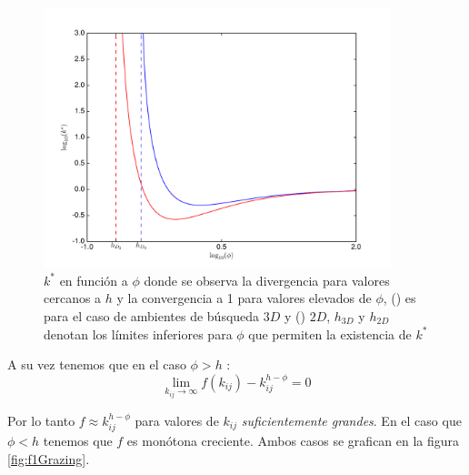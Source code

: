 \begin{figure}
\begin{center}
 \includegraphics[width=0.9\textwidth]{./Plots/kmaxGrazing.pdf}
 \caption[$k^*, Grazing$]{$k^*$ en funci\'on a $\phi$ donde se observa la divergencia para valores cercanos a $h$ y la convergencia a 1 para valores elevados de $\phi$, ({\hwplotB}) es para el caso de ambientes de b\'usqueda $3D$ y ({\hwplotR}) $2D$, $h_{3D}$ y $h_{2D}$ denotan los l\'imites inferiores para $\phi$ que permiten la existencia de $k^*$}
 \label{fig:kmaxGrazing} 
\end{center}
\end{figure}


A su vez tenemos que en el caso $ \phi > h$ :
\begin{equation}
  \lim_{k_{ij} \to \infty} f(k_{ij}) - k_{ij}^{h - \phi} = 0
\end{equation}

Por lo tanto $ f \approx k_{ij}^{h - \phi}$ para valores de $k_{ij}$ \emph{suficientemente grandes}. En el caso que $\phi < h$ tenemos que $f$ es mon\'otona creciente. Ambos casos se grafican en la figura \ref{fig:f1Grazing}.

